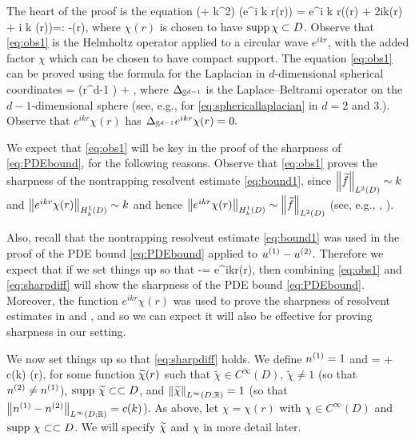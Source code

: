 The heart of the proof is the equation
\beq\label{eq:obs1}
(\Delta + k^2) \big(e^{i k r}\chi(r)\big) =  e^{i k r}\mleft(\Delta \chi(r) + 2ik(r) + i k  \chi(r)\mright)=: -(r),
\eeq
where $\chi(r)$ is chosen to have $\operatorname{supp} \chi \subset D$. Observe that \cref{eq:obs1} is the Helmholtz operator applied to a circular wave $e^{ikr}$, with the added factor $\chi$ which can be chosen to have compact support. The equation \cref{eq:obs1} can be proved using the formula for the Laplacian in $d$-dimensional spherical coordinates
\beq\label{eq:sphericallaplacian}
\Delta \chi =  \mleft(r^{d-1}  \mright) +  \LapBel \chi,
\eeq
where $\Delta_{\mathbb{S}^{d-1}}$ is the Laplace--Beltrami operator on the $d-1$-dimensional sphere (see, e.g., \cite[Equations (17.23) and (17.25)]{RiHoBe:97} for \cref{eq:sphericallaplacian} in $d=2$ and $3.$). Observe that $e^{ikr} \chi(r)$ has $\Delta_{\mathbb{S}^{d-1}} e^{ikr} \chi(r) = 0.$

We expect that \cref{eq:obs1} will be key in the proof of the sharpness of \cref{eq:PDEbound}, for the following reasons. Observe that \cref{eq:obs1} proves the sharpness of the nontrapping resolvent estimate \cref{eq:bound1}, since $\NLtD{\ftilde}\sim k$ and $\NHokD{e^{ikr}\chi(r)}\sim k$  and hence $\NHokD{e^{ikr}\chi(r)} \sim \NLtD{\ftilde}$ (see, e.g., \cite[Lemma 3.10]{ChMo:08},  \cite[Lemma 4.12]{Sp:14}).

Also, recall that  the nontrapping resolvent estimate \cref{eq:bound1} was used in the proof of the PDE bound \cref{eq:PDEbound} applied to ${u}^{(1)}-{u}^{(2)}.$ Therefore we expect that if we set things up so that
\beq\label{eq:sharpdiff}
\uso-\ust = e^{ikr}\chi(r),
\eeq
then  combining \cref{eq:obs1} and \cref{eq:sharpdiff} will show the sharpness of the PDE bound \cref{eq:PDEbound}. Moreover, the function $e^{ikr} \chi(r)$ was used to prove the sharpness of resolvent estimates in \cite[Discussion on p. 1445 and Lemma 3.10]{ChMo:08} and \cite[Lemma 4.12]{Sp:14}, and so we can expect it will also be effective for proving sharpness in our setting.

We now set things up so that \cref{eq:sharpdiff} holds. We define ${n}^{(1)} = 1$ and
\beq\label{eq:fiddlyntdone}
\nst = \nso + c(k) \chitilde(r),
\eeq
for some function $\widetilde{\chi}(r)$ such that $\widetilde{\chi}\in C^{\infty}(D)$, $\widetilde{\chi}\not = 1$ (so that ${n}^{(2)}\not = {n}^{(1)}$), $\operatorname{supp} \, \widetilde{\chi} \subset\subset D$, and $\NLiDRR{\chitilde} = 1$ (so that $\NLiDRR{\nso-\nst} = c(k)$).   As above, let $\chi=\chi(r)$ with $\chi \in C^{\infty}(D)$ and $\operatorname{supp} \,\chi \subset\subset D$. We will specify $\widetilde{\chi}$ and $\chi$ in more detail later.

